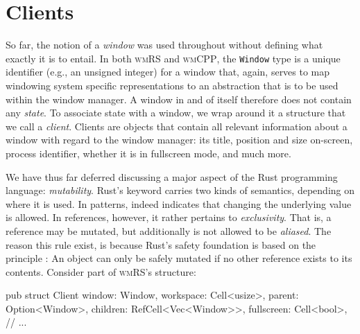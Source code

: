 \section{Clients}

So far, the notion of a \textit{window} was used throughout without defining
what exactly it is to entail. In both \textsc{wmRS} and \textsc{wmCPP}, the
\texttt{Window} type is a unique identifier (e.g., an unsigned integer) for a
window that, again, serves to map windowing system specific representations to
an abstraction that is to be used within the window manager. A window in and of
itself therefore does not contain any \textit{state}. To associate state with a
window, we wrap around it a structure that we call a \textit{client}. Clients
are objects that contain all relevant information about a window with regard to
the window manager: its title, position and size on-screen, process identifier,
whether it is in fullscreen mode, and much more.


We have thus far deferred discussing a major aspect of the Rust
programming language: \textit{mutability}. Rust's  keyword
carries two kinds of semantics, depending on where it is used. In
patterns,  indeed indicates that changing the underlying value
is allowed\cite{therustbook, intmutpatterns}. In references, however,
it rather pertains to \textit{exclusivity}. That is, a 
reference may be mutated, but additionally is not allowed to be
\textit{aliased}\cite{therustbook, intmutpatterns}. The reason this rule
exist, is because Rust's safety foundation is based on the principle
: An object can only be
safely mutated if no other reference exists to its contents\cite{therustbook,
therustreference}. Consider part of \textsc{wmRS}'s  structure:

\begin{rustblock}
  pub struct Client {
    window: Window,
    workspace: Cell<usize>,
    parent: Option<Window>,
    children: RefCell<Vec<Window>>,
    fullscreen: Cell<bool>,
    // ...
  }
\end{rustblock}

